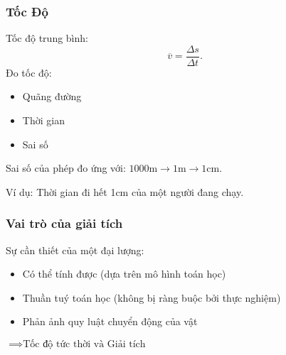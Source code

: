 \begin{frame}
\frametitle{Tốc Độ}
Tốc độ trung bình: 
\[\overline{v}=\frac{\Delta s}{\Delta t}.\]
Đo tốc độ:
\begin{itemize}
    \item Quãng đường 
    \item Thời gian 
    \item Sai số
\end{itemize}
\vspace{8pt}

Sai số của phép đo ứng với: \(1000\text{m}\rightarrow 1\text{m}\rightarrow 1\text{cm}.\)

Ví dụ: Thời gian đi hết 1cm của một người đang chạy.
\end{frame}
\begin{frame}
\frametitle{Vai trò của giải tích}
     Sự cần thiết của một đại lượng:
     \begin{itemize}
        \item Có thể tính được (dựa trên mô hình toán học)
        \item Thuần tuý toán học (không bị ràng buộc bởi thực nghiệm)
        \item Phản ảnh quy luật chuyển động của vật
     \end{itemize}
     \vspace{8pt}

     \(\implies \text{Tốc độ tức thời và Giải tích}\)
\end{frame}